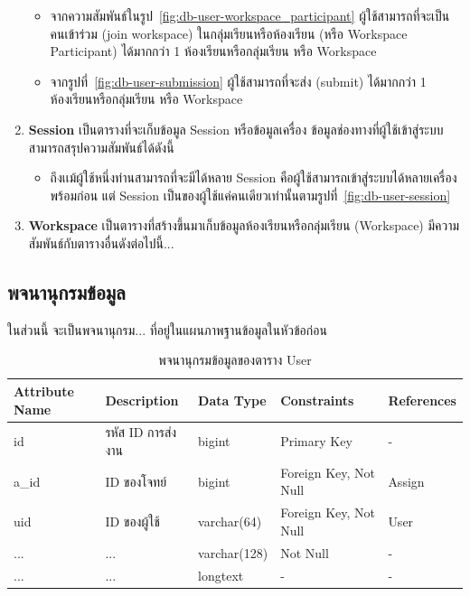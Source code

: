 \documentclass[12pt,one side,openright,a4paper]{cpe-thesis-th}
\newcommand{\thaijustify}[1]{%
  \par\hspace{30pt}\justifying
  #1
}
\begin{document}
\begin{enumerate}
\begin{itemize}
                \item จากความสัมพันธ์ในรูป~\ref{fig:db-user-workspace_participant} ผู้ใช้สามารถที่จะเป็นคนเข้าร่วม (join workspace) ในกลุ่มเรียนหรือห้องเรียน (หรือ Workspace Participant) ได้มากกว่า 1 ห้องเรียนหรือกลุ่มเรียน หรือ Workspace
                \item จากรูปที่~\ref{fig:db-user-submission} ผู้ใช้สามารถที่จะส่ง (submit) ได้มากกว่า 1 ห้องเรียนหรือกลุ่มเรียน หรือ Workspace
            \end{itemize}
        \item \textbf{Session}
            เป็นตารางที่จะเก็บข้อมูล Session หรือข้อมูลเครื่อง ข้อมูลช่องทางที่ผู้ใช้เข้าสู่ระบบ สามารถสรุปความสัมพันธ์ได้ดังนี้
            \begin{itemize}
                \item ถึงเเม้ผู้ใช้หนึ่งท่านสามารถที่จะมีได้หลาย Session คือผู้ใช้สามารถเข้าสู่ระบบได้หลายเครื่องพร้อมก่อน แต่ Session เป็นของผู้ใช้แค่คนเดียวเท่านั้นตามรูปที่~\ref{fig:db-user-session}
            \end{itemize}
        \item \textbf{Workspace}
            เป็นตารางที่สร้างขึ้นมาเก็บข้อมูลห้องเรียนหรือกลุ่มเรียน (Workspace) มีความสัมพันธ์กับตารางอื่นดังต่อไปนี้...
   \end{enumerate} 
    \subsection{พจนานุกรมข้อมูล}
        \thaijustify{
            ในส่วนนี้ จะเป็นพจนานุกรม... ที่อยู่ในแผนภาพฐานข้อมูลในหัวข้อก่อน   
        }
        \begin{table}[H]
            \centering
            \caption{พจนานุกรมข้อมูลของตาราง User}\label{tbl:data-dict-user}
            \begin{tabular}{p{2cm}|p{4cm}p{2cm}p{3cm}p{2cm}} \hline\hline
                Attribute Name & Description & Data Type & Constraints & References \\ \hline\hline
                id & รหัส ID การส่งงาน & bigint & Primary Key & - \\
                a\_id & ID ของโจทย์ & bigint & Foreign Key, Not Null & Assign \\
                uid & ID ของผู้ใช้ & varchar(64) & Foreign Key, Not Null & User \\
                ... & ... & varchar(128) & Not Null & - \\
                ... & ... & longtext & - & - \\ \hline\hline
            \end{tabular}   
        \end{table}
    \pagebreak
\end{document}
